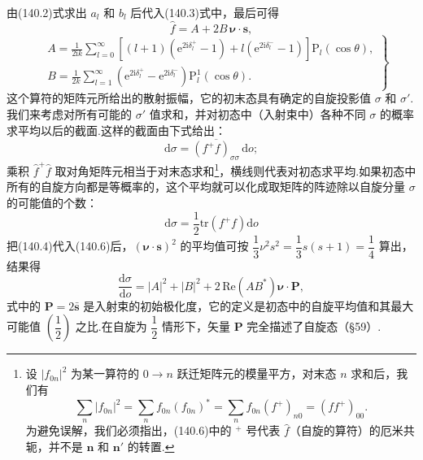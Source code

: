 由(140.2)式求出 $a_l$ 和 $b_l$ 后代入(140.3)式中，最后可得
\begin{equation}
  \hat{f}=A+2B\,\boldsymbol{\nu}\cdot\boldsymbol{s},
\end{equation}
\begin{equation}
\left.
\begin{aligned}
  &A=\frac{1}{2\mathrm{i}k}\sum_{l=0}^{\infty}
  \left[(l+1)\left(\mathrm{e}^{2\mathrm{i}\delta_l^{+}}-1\right)
  +l\left(\mathrm{e}^{2\mathrm{i}\delta_l^{-}}-1\right)\right]
  \mathrm{P}_l(\cos\theta),\\
  &B=\frac{1}{2k}\sum_{l=1}^{\infty}
  \left(\mathrm{e}^{2\mathrm{i}\delta_l^{+}}
  -\mathrm{e}^{2\mathrm{i}\delta_l^{-}}\right)
  \mathrm{P}_l^{1}(\cos\theta).
\end{aligned}
\right\}
\end{equation}
这个算符的矩阵元所给出的散射振幅，它的初末态具有确定的自旋投影值 $\sigma$ 和 $\sigma'$.我们来考虑对所有可能的 $\sigma'$ 值求和，并对初态中（入射束中）各种不同 $\sigma$ 的概率求平均以后的截面.这样的截面由下式给出：
\begin{equation}
  \mathrm{d}\sigma=\overline{\left(f^{+}f\right)_{\sigma\sigma}}\,
  \mathrm{d}o;
\end{equation}
乘积 $\hat{f}^{+}\hat{f}$ 取对角矩阵元相当于对末态求和\footnote{设 $|f_{0n}|^2$ 为某一算符的 $0\to n$ 跃迁矩阵元的模量平方，对末态 $n$ 求和后，我们有
\begin{equation*}
  \sum_n|f_{0n}|^2=\sum_n f_{0n}(f_{0n})^{*}
  =\sum_n f_{0n}(f^{+})_{n0}=(ff^{+})_{00}.
\end{equation*}
为避免误解，我们必须指出，(140.6)中的 $^{+}$ 号代表 $\hat{f}$（自旋的算符）的厄米共轭，并不是 $\boldsymbol{n}$ 和 $\boldsymbol{n}'$ 的转置.}，横线则代表对初态求平均.如果初态中所有的自旋方向都是等概率的，这个平均就可以化成取矩阵的阵迹除以自旋分量 $\sigma$ 的可能值的个数：
\begin{equation}
  \mathrm{d}\sigma=\frac{1}{2}\mathrm{tr}\left(f^{+}f\right)
  \mathrm{d}o
\end{equation}
把(140.4)代入(140.6)后，$(\boldsymbol{\nu}\cdot\boldsymbol{s})^2$ 的平均值可按
$\dfrac{1}{3}\nu^2s^2=\dfrac{1}{3}s(s+1)=\dfrac{1}{4}$ 算出，结果得
\begin{equation}
  \frac{\mathrm{d}\sigma}{\mathrm{d}o}=|A|^2+|B|^2
  +2\,\mathrm{Re}\left(AB^{*}\right)\boldsymbol{\nu}\cdot\boldsymbol{P},
\end{equation}
式中的 $\boldsymbol{P}=2\bar{\boldsymbol{s}}$ 是入射束的初始极化度，它的定义是初态中的自旋平均值和其最大可能值 $\left(\dfrac{1}{2}\right)$ 之比.在自旋为 $\dfrac{1}{2}$ 情形下，矢量 $\boldsymbol{P}$ 完全描述了自旋态（§59）.

